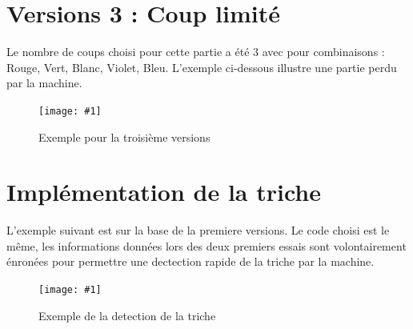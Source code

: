 \documentclass[a4paper,twoside,12pt]{report}
\newcommand{\monimage}[3]{
\par\noindent
\begin{figure}[H] %
\begin{center}
\texttt{[image: \#1]} %
\caption{#2} %
\label{#3} %
\end{center}
\end{figure} %
}
\begin{document}
\section*{Versions 3 : Coup limité}
Le nombre de coups choisi pour cette partie a été 3 avec pour combinaisons : Rouge, Vert, Blanc, Violet, Bleu. L'exemple ci-dessous illustre
une partie perdu par la machine.
\monimage{mode3perdu.png}{Exemple pour la troisième versions}{M3P}
\section*{Implémentation de la triche}
L'exemple suivant est sur la base de la premiere versions. Le code choisi est le même, les informations données lors des deux premiers essais
sont volontairement énronées pour permettre une dectection rapide de la triche par la machine.
\monimage{mode1avectriche}{Exemple de la detection de la triche}{M2AT}
\end{document}
